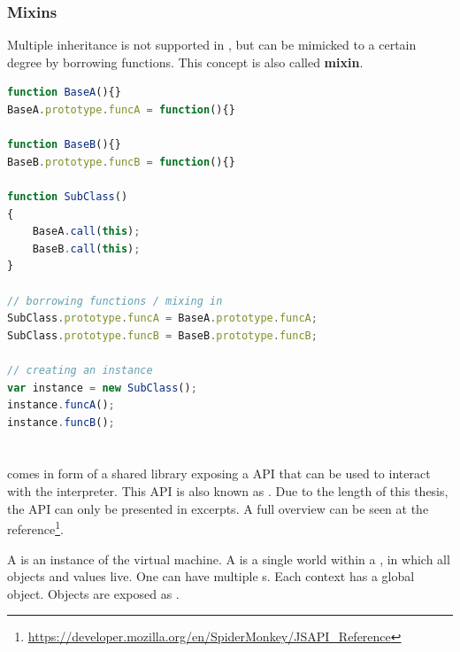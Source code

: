 \subsubsection{Mixins}
\label{sec:Mixins}

Multiple inheritance is not supported in , but can be mimicked to a certain degree by borrowing functions. This concept is also called \textbf{mixin}.

\SingleSpacing
\begin{lstlisting}[language=JavaScript, caption=Mixins in \myProperName{JavaScript}, label=JSMixins]
function BaseA(){}
BaseA.prototype.funcA = function(){}

function BaseB(){}
BaseB.prototype.funcB = function(){}

function SubClass()
{
	BaseA.call(this);
	BaseB.call(this);
}

// borrowing functions / mixing in
SubClass.prototype.funcA = BaseA.prototype.funcA;
SubClass.prototype.funcB = BaseB.prototype.funcB;

// creating an instance
var instance = new SubClass();
instance.funcA();
instance.funcB();
\end{lstlisting}
\OnehalfSpacing

\section{}

 comes in form of a shared library exposing a  API that can be used to interact with the  interpreter. This API is also known as . Due to the length of this thesis, the API can only be presented in excerpts. A full overview can be seen at the  reference\footnote{\url{https://developer.mozilla.org/en/SpiderMonkey/JSAPI_Reference}}.

A  is an instance of the virtual machine. A  is a single world within a , in which all objects and values live. One  can have multiple s. Each context has a global object. Objects are exposed as .

